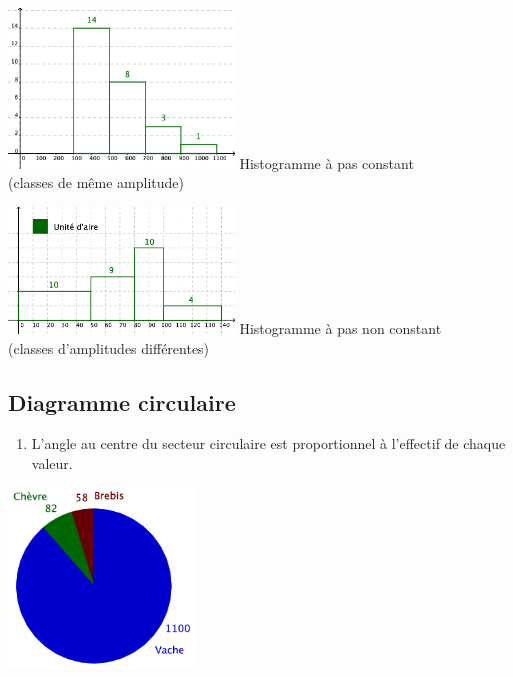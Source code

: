 \begin{multicols}{2}
  \begin{center}
    \includegraphics[width=6cm]{Stats_Fig4_HistPC.png}
    Histogramme à pas constant \\
    (classes de même amplitude)     
  \end{center}

  \columnbreak

  \begin{center}
    \includegraphics[width=6cm]{Stats_Fig4_HistPNC.png}
    Histogramme à pas non constant \\
    (classes d'amplitudes différentes)
  \end{center}
  
\end{multicols}




\subsection{Diagramme circulaire}

\begin{multicols}{2}
  \begin{enumerate}
  \item L'angle au centre du secteur circulaire est proportionnel à l'effectif
    de chaque valeur.
  \end{enumerate}
  
  
  \columnbreak
  \begin{minipage}{1.0\linewidth}
    \vspace{-2em}
    \begin{center}
      \includegraphics[width=5cm]{Stats_Fig4_DiagCirc.png}
    \end{center}    
  \end{minipage}
\end{multicols}



